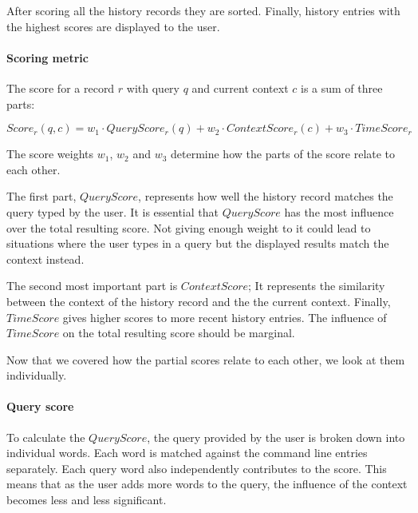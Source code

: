 After scoring all the history records they are sorted. Finally, history entries with the highest scores are displayed to the user.

\paragraph{Scoring metric}

The score for a record \(r\) with query \(q\) and current context \(c\) is a sum of three parts: 

\[ Score_r(q,c) = w_1 \cdot QueryScore_r(q) + w_2 \cdot ContextScore_r(c) + w_3 \cdot TimeScore_r \]

The score weights \(w_1\), \(w_2\) and \(w_3\) determine how the parts of the score relate to each other. 

The first part, \(QueryScore\), represents how well the history record matches the query typed by the user. It is essential that \(QueryScore\) has the most influence over the total resulting score. Not giving enough weight to it could lead to situations where the user types in a query but the displayed results match the context instead. 

The second most important part is \(ContextScore\); It represents the similarity between the context of the history record and the the current context. Finally, \(TimeScore\) gives higher scores to more recent history entries. The influence of \(TimeScore\) on the total resulting score should be marginal.

Now that we covered how the partial scores relate to each other, we look at them individually.






\paragraph{Query score}

To calculate the \(QueryScore\), the query provided by the user is broken down into individual words. 
Each word is matched against the command line entries separately. Each query word also independently contributes to the score. This means that as the user adds more words to the query, the influence of the context becomes less and less significant.

